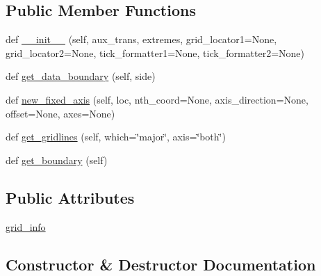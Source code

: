 \subsection*{Public Member Functions}
\begin{DoxyCompactItemize}
\item 
def \hyperlink{classaxisartist_1_1floating__axes_1_1GridHelperCurveLinear_a12f7dfdc22219048ed57f986689d9a15}{\+\_\+\+\_\+init\+\_\+\+\_\+} (self, aux\+\_\+trans, extremes, grid\+\_\+locator1=None, grid\+\_\+locator2=None, tick\+\_\+formatter1=None, tick\+\_\+formatter2=None)
\item 
def \hyperlink{classaxisartist_1_1floating__axes_1_1GridHelperCurveLinear_a6594a72015589a56ce44d8dd989f7c27}{get\+\_\+data\+\_\+boundary} (self, side)
\item 
def \hyperlink{classaxisartist_1_1floating__axes_1_1GridHelperCurveLinear_a322a7edf51b0d15af41882a1bbe76552}{new\+\_\+fixed\+\_\+axis} (self, loc, nth\+\_\+coord=None, axis\+\_\+direction=None, offset=None, axes=None)
\item 
def \hyperlink{classaxisartist_1_1floating__axes_1_1GridHelperCurveLinear_adafe6458804ea05d3aca306914f5c5af}{get\+\_\+gridlines} (self, which=\char`\"{}major\char`\"{}, axis=\char`\"{}both\char`\"{})
\item 
def \hyperlink{classaxisartist_1_1floating__axes_1_1GridHelperCurveLinear_a50c7d095d2570499748b29327c74e267}{get\+\_\+boundary} (self)
\end{DoxyCompactItemize}
\subsection*{Public Attributes}
\begin{DoxyCompactItemize}
\item 
\hyperlink{classaxisartist_1_1floating__axes_1_1GridHelperCurveLinear_ada8bfac70ca5fbab6887add4c234c5e3}{grid\+\_\+info}
\end{DoxyCompactItemize}


\subsection{Constructor \& Destructor Documentation}
\mbox{\label{classaxisartist_1_1floating__axes_1_1GridHelperCurveLinear_a12f7dfdc22219048ed57f986689d9a15}} 
